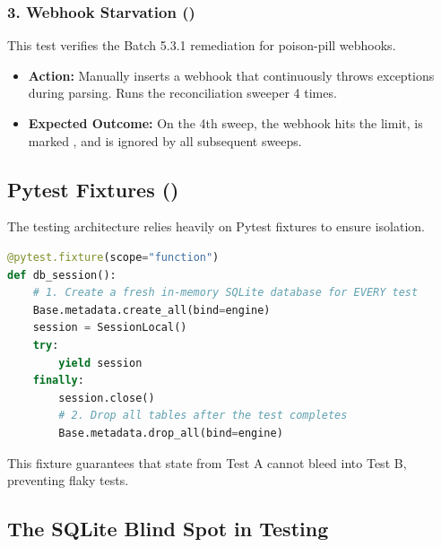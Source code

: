 \subsubsection{3. Webhook Starvation ()}
This test verifies the Batch 5.3.1 remediation for poison-pill webhooks.
\begin{itemize}
    \item \textbf{Action:} Manually inserts a webhook that continuously throws exceptions during parsing. Runs the reconciliation sweeper 4 times.
    \item \textbf{Expected Outcome:} On the 4th sweep, the webhook hits the  limit, is marked , and is ignored by all subsequent sweeps.
\end{itemize}

\vspace{0.8cm}

\subsection{Pytest Fixtures ()}

The testing architecture relies heavily on Pytest fixtures to ensure isolation.

\begin{tcolorbox}[codebox={Database Isolation Fixture}]
\begin{lstlisting}[language=Python]
@pytest.fixture(scope="function")
def db_session():
    # 1. Create a fresh in-memory SQLite database for EVERY test
    Base.metadata.create_all(bind=engine)
    session = SessionLocal()
    try:
        yield session
    finally:
        session.close()
        # 2. Drop all tables after the test completes
        Base.metadata.drop_all(bind=engine)
\end{lstlisting}
\end{tcolorbox}

This fixture guarantees that state from Test A cannot bleed into Test B, preventing flaky tests.

\vspace{0.8cm}

\subsection{The SQLite Blind Spot in Testing}


